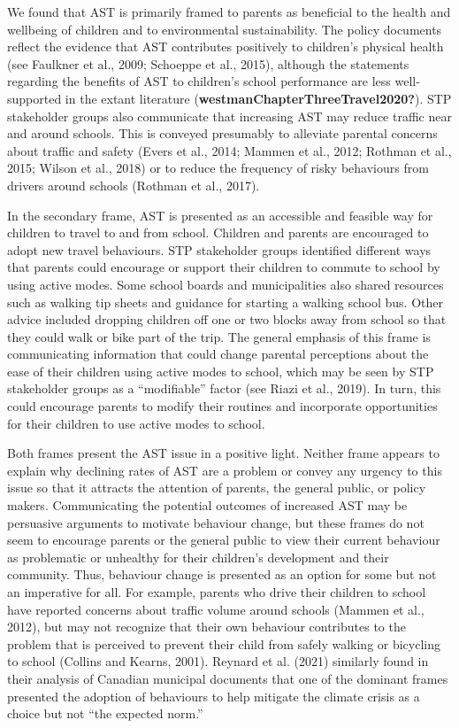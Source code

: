 \documentclass[]{elsarticle} %
\begin{document}
We found that AST is primarily framed to parents as beneficial to the
health and wellbeing of children and to environmental sustainability.
The policy documents reflect the evidence that AST contributes
positively to children's physical health (see Faulkner et al., 2009;
Schoeppe et al., 2015), although the statements regarding the benefits
of AST to children's school performance are less well-supported in the
extant literature (\textbf{westmanChapterThreeTravel2020?}). STP
stakeholder groups also communicate that increasing AST may reduce
traffic near and around schools. This is conveyed presumably to
alleviate parental concerns about traffic and safety (Evers et al.,
2014; Mammen et al., 2012; Rothman et al., 2015; Wilson et al., 2018) or
to reduce the frequency of risky behaviours from drivers around schools
(Rothman et al., 2017).

In the secondary frame, AST is presented as an accessible and feasible
way for children to travel to and from school. Children and parents are
encouraged to adopt new travel behaviours. STP stakeholder groups
identified different ways that parents could encourage or support their
children to commute to school by using active modes. Some school boards
and municipalities also shared resources such as walking tip sheets and
guidance for starting a walking school bus. Other advice included
dropping children off one or two blocks away from school so that they
could walk or bike part of the trip. The general emphasis of this frame
is communicating information that could change parental perceptions
about the ease of their children using active modes to school, which may
be seen by STP stakeholder groups as a ``modifiable'' factor (see Riazi
et al., 2019). In turn, this could encourage parents to modify their
routines and incorporate opportunities for their children to use active
modes to school.

Both frames present the AST issue in a positive light. Neither frame
appears to explain why declining rates of AST are a problem or convey
any urgency to this issue so that it attracts the attention of parents,
the general public, or policy makers. Communicating the potential
outcomes of increased AST may be persuasive arguments to motivate
behaviour change, but these frames do not seem to encourage parents or
the general public to view their current behaviour as problematic or
unhealthy for their children's development and their community. Thus,
behaviour change is presented as an option for some but not an
imperative for all. For example, parents who drive their children to
school have reported concerns about traffic volume around schools
(Mammen et al., 2012), but may not recognize that their own behaviour
contributes to the problem that is perceived to prevent their child from
safely walking or bicycling to school (Collins and Kearns, 2001).
Reynard et al. (2021) similarly found in their analysis of Canadian
municipal documents that one of the dominant frames presented the
adoption of behaviours to help mitigate the climate crisis as a choice
but not ``the expected norm.''
\end{document}
